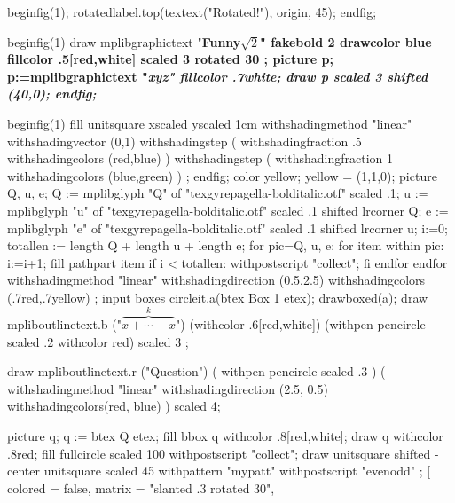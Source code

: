   beginfig(1);
    rotatedlabel.top(textext("Rotated!"), origin, 45);
  endfig;
\endmplibcode
\par
\mplibcode
beginfig(1) %
draw mplibgraphictext "\bf Funny$\sqrt{2}$"
  fakebold 2 %
  drawcolor blue fillcolor .5[red,white]
  scaled 3 rotated 30 ;
picture p;
p:=mplibgraphictext "\it xyz"
  fillcolor .7white;
draw p scaled 3 shifted (40,0);
endfig;
\endmplibcode
\par
\mplibcode
beginfig(1)
fill unitsquare xscaled \mpdim\hsize yscaled 1cm
    withshadingmethod "linear"
    withshadingvector (0,1)
    withshadingstep (
       withshadingfraction .5
       withshadingcolors (red,blue)
    )
    withshadingstep (
       withshadingfraction 1
       withshadingcolors (blue,green)
    )
    ;
endfig;
\endmplibcode
\leavevmode
\mpfig
color yellow; yellow = (1,1,0);
picture Q, u, e;
Q := mplibglyph "Q" of "texgyrepagella-bolditalic.otf" scaled .1;
u := mplibglyph "u" of "texgyrepagella-bolditalic.otf" scaled .1 shifted lrcorner Q;
e := mplibglyph "e" of "texgyrepagella-bolditalic.otf" scaled .1 shifted lrcorner u;
i:=0;
totallen := length Q + length u + length e;
for pic=Q, u, e:
  for item within pic:
    i:=i+1;
    fill pathpart item
    if i < totallen: withpostscript "collect"; fi
  endfor
endfor
  withshadingmethod "linear"
  withshadingdirection (0.5,2.5)
  withshadingcolors (.7red,.7yellow)
  ;
\endmpfig
{}%
\mpfig* input boxes \endmpfig
\mpfig circleit.a(btex Box 1 etex); drawboxed(a); \endmpfig
\def\mpfiginstancename{mympfig}%
\mpfig
draw mpliboutlinetext.b ("$\overbrace{x+\cdots+x}^k$")
    (withcolor .6[red,white])
    (withpen pencircle scaled .2 withcolor red)
    scaled 3 ;
\endmpfig
\par
\mpfig
  draw mpliboutlinetext.r
    ("Question")
    ( withpen pencircle scaled .3 )
    (
      withshadingmethod "linear"
      withshadingdirection (2.5, 0.5)
      withshadingcolors(red, blue)
    )
    scaled 4;
\endmpfig
\par\leavevmode
{}
  \mpfig
    picture q;
    q := btex Q etex;
    fill bbox q withcolor .8[red,white];
    draw q withcolor .8red;
  \endmpfig
\endmppattern
\mpfig
  fill fullcircle scaled 100 withpostscript "collect";
  draw unitsquare shifted - center unitsquare scaled 45
    withpattern "mypatt"
    withpostscript "evenodd"
    ;
\endmpfig
{}
  [
    colored = false,
    matrix = "slanted .3 rotated 30",
